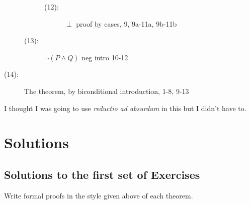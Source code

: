 \documentclass[12pt]{article}
\begin{document}
\begin{description}
\begin{description}
\begin{description}
\item[(12):]  $\perp$ proof by cases, 9, 9a-11a, 9b-11b

\end{description}

\item[(13):]  $\neg(P \wedge Q)$  neg intro 10-12

\end{description}

\item[(14):]  The theorem, by biconditional introduction, 1-8, 9-13

\end{description}

I thought I was going to use {\em reductio ad absurdum\/} in this but I didn't have to.

\newpage


\section{Solutions}

\subsection{Solutions to the first set of Exercises}

Write formal proofs in the style given above of each theorem.
\end{document}
